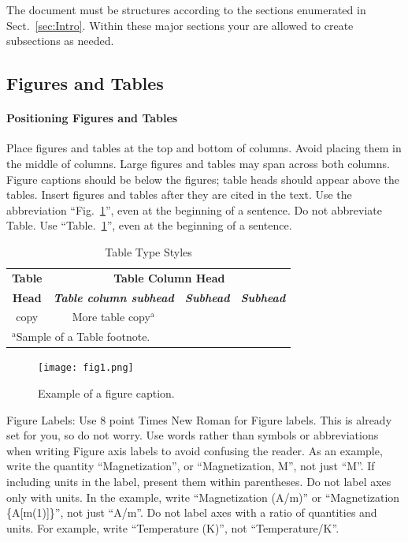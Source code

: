 \documentclass[conference]{IEEEtran}
\begin{document}
The document must be structures according to the sections enumerated in Sect.~\ref{sec:Intro}. 
Within these major sections your are allowed to create subsections as needed.

\subsection{Figures and Tables}
\paragraph{Positioning Figures and Tables} Place figures and tables at the top and bottom of columns. Avoid placing them in the middle of columns. Large figures and tables may span across both columns. Figure captions should be below the figures; table heads should appear above the tables. Insert figures and tables after they are cited in the text. Use the abbreviation ``Fig.~\ref{fig}'', even at the beginning of a sentence. Do not abbreviate Table. Use ``Table.~\ref{tab1}'', even at the beginning of a sentence.

\begin{table}[htbp]
\caption{Table Type Styles}
\begin{center}
\begin{tabular}{|c|c|c|c|}
\hline
\textbf{Table}&\multicolumn{3}{|c|}{\textbf{Table Column Head}} \\
\cline{2-4} 
\textbf{Head} & \textbf{\textit{Table column subhead}}& \textbf{\textit{Subhead}}& \textbf{\textit{Subhead}} \\
\hline
copy& More table copy$^{\mathrm{a}}$& &  \\
\hline
\multicolumn{4}{l}{$^{\mathrm{a}}$Sample of a Table footnote.}
\end{tabular}
\label{tab1}
\end{center}
\end{table}

\begin{figure}[htbp]
\centerline{\texttt{[image: fig1.png]}}
\caption{Example of a figure caption.}
\label{fig}
\end{figure}

Figure Labels: Use 8 point Times New Roman for Figure labels. This is already set for you, so do not worry. Use words 
rather than symbols or abbreviations when writing Figure axis labels to avoid confusing the reader. As an example, write the quantity 
``Magnetization'', or ``Magnetization, M'', not just ``M''. If including 
units in the label, present them within parentheses. Do not label axes only with units. In the example, write ``Magnetization (A/m)'' or ``Magnetization \{A[m(1)]\}'', not just ``A/m''. Do not label axes with a ratio of quantities and units. For example, write ``Temperature (K)'', not ``Temperature/K''.
\end{document}
